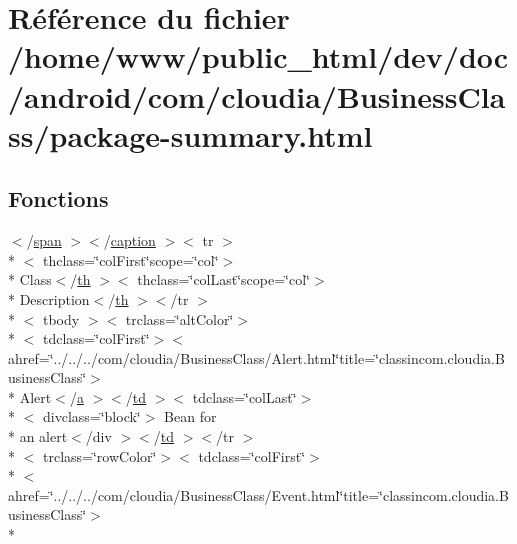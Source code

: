 \hypertarget{com_2cloudia_2_business_class_2package-summary_8html}{\section{Référence du fichier /home/www/public\-\_\-html/dev/doc/android/com/cloudia/\-Business\-Class/package-\/summary.html}
\label{com_2cloudia_2_business_class_2package-summary_8html}
}
\subsection*{Fonctions}
\begin{DoxyCompactItemize}
\item 
$<$/\hyperlink{stylesheet_8css_a8343996ebcf16220b04e54659aac31cc}{span} $>$$<$/\hyperlink{stylesheet_8css_af80f57db1ff8f5d004463f9fcbf50c6f}{caption} $>$$<$ tr $>$\\*
$<$ thclass=\char`\"{}col\-First\char`\"{}scope=\char`\"{}col\char`\"{}$>$\\*
 Class$<$/\hyperlink{stylesheet_8css_a0910f46cbaedf1a50e2b4337fde699db}{th} $>$$<$ thclass=\char`\"{}col\-Last\char`\"{}scope=\char`\"{}col\char`\"{}$>$\\*
 Description$<$/\hyperlink{stylesheet_8css_a0910f46cbaedf1a50e2b4337fde699db}{th} $>$$<$/tr $>$\\*
$<$ tbody $>$$<$ trclass=\char`\"{}alt\-Color\char`\"{}$>$\\*
$<$ tdclass=\char`\"{}col\-First\char`\"{}$>$$<$ ahref=\char`\"{}../../../com/cloudia/Business\-Class/Alert.\-html\char`\"{}title=\char`\"{}classincom.\-cloudia.\-Business\-Class\char`\"{}$>$\\*
 Alert$<$/\hyperlink{style_8css_a5e8981582017bb8b84c21f148345d1f7}{a} $>$$<$/\hyperlink{stylesheet_8css_a2635d454965afd759ce151c6f6d1a04a}{td} $>$$<$ tdclass=\char`\"{}col\-Last\char`\"{}$>$\\*
$<$ divclass=\char`\"{}block\char`\"{}$>$ Bean for \\*
an alert$<$/div $>$$<$/\hyperlink{stylesheet_8css_a2635d454965afd759ce151c6f6d1a04a}{td} $>$$<$/tr $>$\\*
$<$ trclass=\char`\"{}row\-Color\char`\"{}$>$$<$ tdclass=\char`\"{}col\-First\char`\"{}$>$\\*
$<$ ahref=\char`\"{}../../../com/cloudia/Business\-Class/Event.\-html\char`\"{}title=\char`\"{}classincom.\-cloudia.\-Business\-Class\char`\"{}$>$\\*
$$
\end{DoxyCompactItemize}
